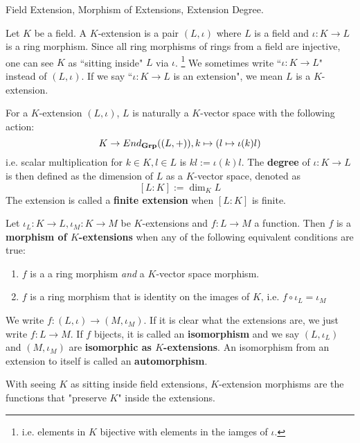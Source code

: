 \documentclass[../book.tex]{subfiles}
\begin{document}
\begin{dfn} Field Extension, Morphism of Extensions, Extension Degree.

    Let $K$ be a field. 
    A $K$-extension is a pair $(L,\iota)$ where $L$ is a field 
    and $\iota : K \to L$ is a ring morphism. 
    Since all ring morphisms of rings from a field are injective,
    one can see $K$ as ``sitting inside" $L$ via $\iota$.
    \footnote{
        i.e. elements in $K$ bijective with 
        elements in the iamges of $\iota$. 
    }
    We sometimes write ``$\iota : K \to L$" instead of $(L,\iota)$.
    If we say ``$\iota : K \to L$ is an extension", we mean
    $L$ is a $K$-extension.
    
    For a $K$-extension $(L,\iota)$, 
    $L$ is naturally a $K$-vector space with the following action: 
    \[
        K \to End_{\mathbf{Grp}}((L,+)), k \mapsto (l \mapsto \iota(k) l)
    \]
    i.e. scalar multiplication for $k \in K, l \in L$ is $kl := \iota(k)l$.
    The \textbf{degree} of $\iota : K \to L$ is then defined as
    the dimension of $L$ as a $K$-vector space, denoted as \[
        [L : K] := \dim_K L
    \]
    The extension is called a \textbf{finite extension} when $[L:K]$ is finite. 
    
    Let $\iota_L : K \to L, \iota_M : K \to M$ be $K$-extensions and
    $f : L \to M$ a function.
    Then $f$ is a \textbf{morphism of $K$-extensions} when 
    any of the following equivalent conditions are true: 
    \begin{enumerate}
        \item $f$ is a a ring morphism \emph{and} a $K$-vector space morphism.
        \item $f$ is a ring morphism that is identity on the images of $K$, i.e.
        $f\circ\iota_L = \iota_M$
    \end{enumerate}
    We write $f : (L,\iota) \to (M,\iota_M)$. 
    If it is clear what the extensions are, we just write $f : L \to M$. 
    If $f$ bijects, it is called an \textbf{isomorphism} and
    we say $(L,\iota_L)$ and $(M,\iota_M)$ are \textbf{isomorphic as $K$-extensions}.
    An isomorphism from an extension to itself is called an \textbf{automorphism}. 
    
    With seeing $K$ as sitting inside field extensions, 
    $K$-extension morphisms are the functions that "preserve $K$" 
    inside the extensions. 
\end{dfn}
\end{document}
